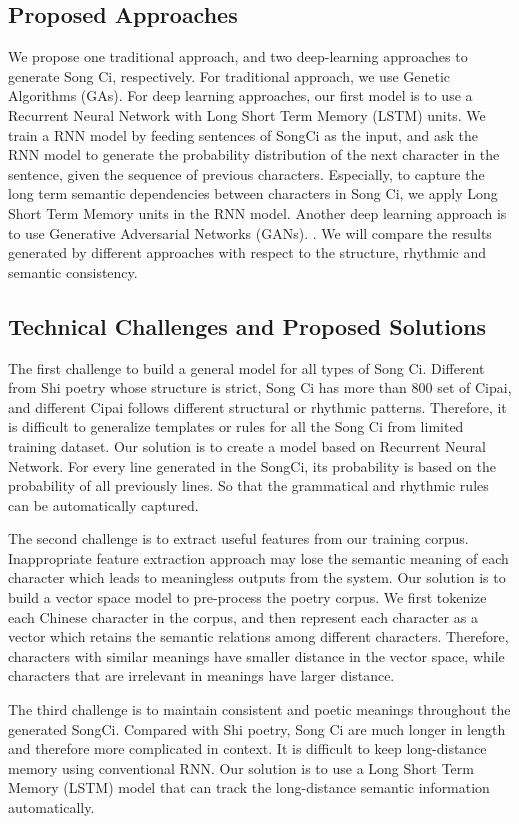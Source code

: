 \subsection{Proposed Approaches} 
%
We propose one traditional approach, and two deep-learning approaches to generate Song Ci, respectively.
%
For traditional approach, we use Genetic Algorithms (GAs).
%
For deep learning approaches, our first model is to use a Recurrent Neural Network  with Long Short Term Memory (LSTM) units. 
%
We train a RNN model by feeding sentences of SongCi as the input, and ask the RNN model to generate the probability distribution of the next character in the sentence, given the sequence of previous characters.
%
Especially, to capture the long term semantic dependencies between characters in Song Ci,
%
we apply Long Short Term Memory units in the RNN model. 
Another deep learning approach is to use Generative Adversarial Networks (GANs).
%
.
%
We will compare the results generated by different approaches with respect to the structure, rhythmic and semantic consistency.
 
\subsection{Technical Challenges and Proposed Solutions} 
The first challenge to build a general model for all types of Song Ci.
%
Different from Shi poetry whose structure is strict,  Song Ci has more than 800 set of Cipai, and different Cipai follows different structural or rhythmic patterns.
%
Therefore, it is difficult to generalize templates or rules for all the Song Ci from limited training dataset.
% 
Our solution is to create a model based on Recurrent Neural Network. For every line generated in the SongCi, its probability is based on the probability of all previously lines.
%
So that the grammatical and rhythmic rules can be automatically captured.


The second challenge is to extract useful features from our training corpus.
%
Inappropriate feature extraction approach may lose the semantic meaning of each character which leads to meaningless outputs from the system.
%
Our solution is to build a vector space model to pre-process the poetry corpus. We first tokenize each Chinese character in the corpus, and then represent each character as a vector which retains the semantic relations among different characters. Therefore, characters with similar meanings have smaller distance in the vector space, while characters that are irrelevant in meanings have larger distance. 


The third challenge is to maintain consistent and poetic meanings throughout the generated SongCi.
%
Compared with Shi poetry, Song Ci are much longer in length and therefore more complicated in context.
%
It is difficult to keep long-distance memory using conventional RNN.
% 
Our solution is to use a Long Short Term Memory (LSTM) model that can track the long-distance semantic information automatically. 